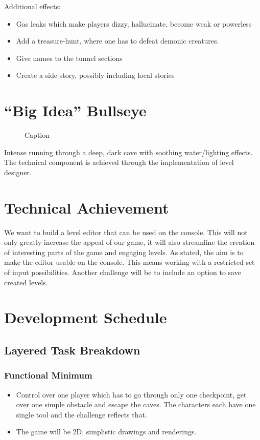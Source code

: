 \vspace{0.5cm}
Additional effects:
\begin{itemize}
    \item Gas leaks which make players dizzy, hallucinate, become weak or powerless
    \item Add a treasure-hunt, where one has to defeat demonic creatures.
    \item Give names to the tunnel sections 
    \item Create a side-story, possibly including local stories

\end{itemize}


\section{\enquote{Big Idea} Bullseye}
\begin{figure}
    \centering
    \caption{Caption}
    \label{fig:my_label}
\end{figure}
Intense running through a deep, dark cave with soothing water/lighting effects. The technical component is achieved through the implementation of level designer.


\section{Technical Achievement}
We want to build a level editor that can be used on the console. This will not only greatly increase the appeal of our game, it will also streamline the creation of interesting parts of the game and engaging levels.
As stated, the aim is to make the editor usable on the console. This means working with a restricted set of input possibilities. Another challenge will be to include an option to save created levels.

\section{Development Schedule}
\subsection{Layered Task Breakdown}
\subsubsection{Functional Minimum}
\begin{itemize}
    \item Control over one player which has to go through only one checkpoint, get over one simple obstacle and escape the caves. The characters each have one single tool and the challenge reflects that. 
\item The game will be 2D, simplistic drawings and renderings.
\end{itemize}

